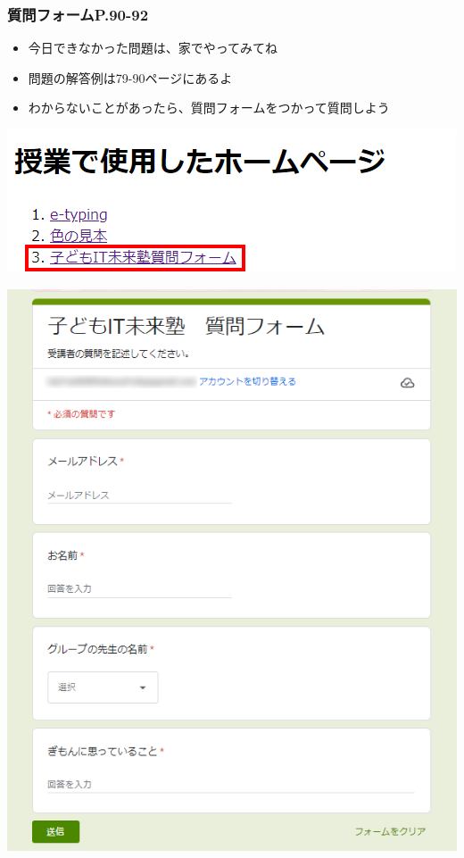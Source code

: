 \documentclass[dvipdfmx]{beamer}
\begin{document}
\begin{frame}[fragile]
	\frametitle{質問フォームP.90-92~~~}
    \begin{minipage}{0.6\textwidth}
      \begin{itemize}
        \item 今日できなかった問題は、家でやってみてね
        \bigskip
        \item 問題の解答例は79-90ページにあるよ
        \bigskip
        \item わからないことがあったら、質問フォームをつかって質問しよう
      \end{itemize}
      \includegraphics[width=\textwidth]{slide04_012.png}
    \end{minipage}    
    \hfill
    \begin{minipage}{0.38\textwidth}
      \includegraphics[height=0.7\textheight]{slide04_011.png}
    \end{minipage}
    \vfill
\end{frame}
\end{document}
